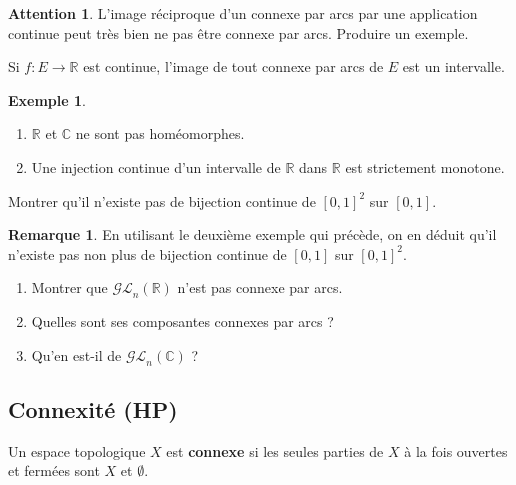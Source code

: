 \documentclass[french]{article}
\newcommand{\R}{\mathbb{R}}
\newcommand{\C}{\mathbb{C}}
\theoremstyle{plain}
\theoremstyle{definition}
\newtheorem*{ex}{Exemple}
\newtheorem*{rmq}{Remarque}
\newtheorem*{attention}{Attention}
\theoremstyle{remark}
\begin{document}
\begin{attention}
	L'image réciproque d'un connexe par arcs par une application continue peut très bien ne pas être connexe par arcs. Produire un exemple.
\end{attention}

\begin{cor}%
	Si $f:E\to\R$ est continue, l'image de tout connexe par arcs de $E$ est un intervalle.
\end{cor}

\begin{ex}
	\begin{enumerate}
		\item $\R$ et $\C$ ne sont pas homéomorphes.
		\item Une injection continue d'un intervalle de $\R$ dans $\R$ est strictement monotone.
	\end{enumerate}
\end{ex}

\begin{exo}
	Montrer qu'il n'existe pas de bijection continue de $[0,1]^2$ sur $[0,1]$.
\end{exo}

\begin{rmq}
	En utilisant le deuxième exemple qui précède, on en déduit qu'il n'existe pas non plus de bijection continue de $[0,1]$ sur $[0,1]^2$.
\end{rmq}

\begin{exo}
	\begin{enumerate}
		\item Montrer que $\mathcal{GL}_n(\R)$ n'est pas connexe par arcs. %
		\item Quelles sont ses composantes connexes par arcs ? %
		\item Qu'en est-il de $\mathcal{GL}_n(\C)$ ?
	\end{enumerate}
\end{exo}

\subsection{Connexité (HP)}

\begin{dfn}
	Un espace topologique $X$ est \textbf{connexe} si les seules parties de $X$ à la fois ouvertes et fermées sont $X$ et $\emptyset$.
\end{dfn}
\end{document}
